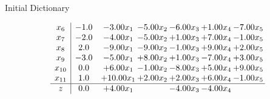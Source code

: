 \documentclass[8pt]{article}
\begin{document}
Initial Dictionary 

\[\begin{array}{c| c c@{\hskip 2pt} c@{\hskip 2pt} c@{\hskip 2pt} c@{\hskip 2pt} c@{\hskip 2pt} }
 x_{6}   &  -1.0 & -3.00 x_{1} & -5.00 x_{2} & -6.00 x_{3} & +  1.00 x_{4} & -7.00 x_{5}\\
 x_{7}   &  -2.0 & -4.00 x_{1} & -5.00 x_{2} & +  1.00 x_{3} & +  7.00 x_{4} & -1.00 x_{5}\\
 x_{8}   &  2.0 & -9.00 x_{1} & -9.00 x_{2} & -1.00 x_{3} & +  9.00 x_{4} & +  2.00 x_{5}\\
 x_{9}   &  -3.0 & -5.00 x_{1} & +  8.00 x_{2} & +  1.00 x_{3} & -7.00 x_{4} & +  3.00 x_{5}\\
 x_{10}   &  0.0 & +  6.00 x_{1} & -1.00 x_{2} & -8.00 x_{3} & +  5.00 x_{4} & +  9.00 x_{5}\\
 x_{11}   &  1.0 & + 10.00 x_{1} & +  2.00 x_{2} & +  2.00 x_{3} & +  6.00 x_{4} & -1.00 x_{5}\\
\hline
z    &  0.0 & +  4.00 x_{1} &   & -4.00 x_{3} & -4.00 x_{4} &   \\
\end{array}\]
\end{document}
